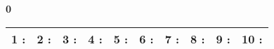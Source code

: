 \documentclass[a4paper, 11pt]{article}
\begin{document}
{\Large\bf 0 } \hspace{1.5cm}
\begin{tabular}{| l|l|l|l|l|l|l|l|l|l| }
\hline
{\large 1 }: \hspace*{0.5cm}
& {\large 2 }: \hspace*{0.5cm}
& {\large 3 }: \hspace*{0.5cm}
& {\large 4 }: \hspace*{0.5cm}
& {\large 5 }: \hspace*{0.5cm}
& {\large 6 }: \hspace*{0.5cm}
& {\large 7 }: \hspace*{0.5cm}
& {\large 8 }: \hspace*{0.5cm}
& {\large 9 }: \hspace*{0.5cm}
& {\large 10 }: \hspace*{0.5cm}
\\ 
 \hline
\end{tabular}
\vspace*{1cm} 
\end{document}
